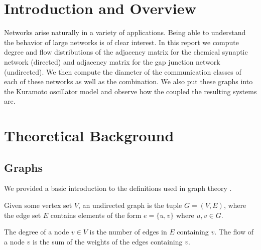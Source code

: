 \documentclass[10pt]{article}
\begin{document}

\section{Introduction and Overview}
Networks arise naturally in a variety of applications. Being able to understand the behavior of large networks is of clear interest. In this report we compute degree and flow distributions of the adjacency matrix for the chemical synaptic network (directed) and adjacency matrix for the gap junction network (undirected). We then compute the diameter of the communication classes of each of these networks as well as the combination. We also put these graphs into the Kuramoto oscillator model and observe how the coupled the resulting systems are.

\section{Theoretical Background}

\subsection{Graphs}
We provided a basic introduction to the definitions used in graph theory \cite{graph_notes}.

Given some vertex set \( V \), an undirected graph is the tuple \( G = (V,E) \), where the edge set \( E \) contains elements of the form \( e=\{u,v\} \) where \( u,v\in G \).

The degree of a node \( v\in V \) is the number of edges in \( E \) containing \( v \). The flow of a node \( v \) is the sum of the weights of the edges containing \( v \).
\end{document}
